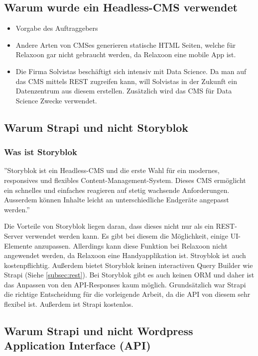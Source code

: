 \subsection{Warum wurde ein Headless-CMS verwendet}
\begin{itemize}
    \item Vorgabe des Auftraggebers
    \item Andere Arten von CMSes generieren statische HTML Seiten, welche für Relaxoon gar nicht gebraucht werden,
          da Relaxoon eine mobile App ist.
    \item Die Firma Solvistas beschäftigt sich intensiv mit Data Science. Da man auf das CMS mittels REST zugreifen kann,
          will Solvistas in der Zukunft ein Datenzentrum aus diesem erstellen.
          Zusätzlich wird das CMS für Data Science Zwecke verwendet.
\end{itemize}

\subsection{Warum Strapi und nicht Storyblok}
\subsubsection{Was ist Storyblok}
''Storyblok ist ein Headless-CMS und die erste Wahl für ein modernes,
responsives und flexibles Content-Management-System.
Dieses CMS ermöglicht ein schnelles und einfaches reagieren auf stetig wachsende Anforderungen.
Ausserdem können Inhalte leicht an unterschiedliche Endgeräte angepasst werden.''
\cite{storyblok}

Die Vorteile von Storyblok liegen daran, dass dieses nicht nur als ein REST-Server verwendet werden kann. Es gibt bei diesem die Möglichkeit, einige UI-Elemente anzupassen. Allerdings kann diese Funktion bei Relaxoon nicht angewendet werden, da Relaxoon eine Handyapplikation ist.
Stroyblok ist auch kostenpflichtig. Außerdem bietet Storyblok keinen interactiven Query Builder wie Strapi (Siehe \ref*{subsec:rest}). Bei Storyblok gibt es auch keinen ORM und daher ist das Anpassen von den API-Responses kaum möglich. \cite{storyblok-bad}
Grundsätzlich war Strapi die richtige Entscheidung für die vorleigende Arbeit, da die API von diesem sehr flexibel ist. Außerdem ist Strapi kostenlos.


\subsection{Warum Strapi und nicht Wordpress \textbf{Ap}plication \textbf{I}nterface (API)}



